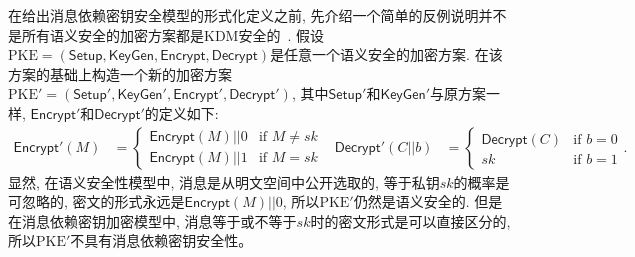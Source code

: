 在给出消息依赖密钥安全模型的形式化定义之前, 先介绍一个简单的反例说明并不是所有语义安全的加密方案都是KDM安全的~\cite{CGH2012}. 假设$\text{PKE} = (\mathsf{Setup}, \mathsf{KeyGen}, \mathsf{Encrypt}, \mathsf{Decrypt})$是任意一个语义安全的加密方案. 在该方案的基础上构造一个新的加密方案$\text{PKE}' = (\mathsf{Setup}', \mathsf{KeyGen}', \mathsf{Encrypt}', \mathsf{Decrypt}')$, 其中$\mathsf{Setup}'$和$\mathsf{KeyGen}'$与原方案一样, $\mathsf{Encrypt}'$和$\mathsf{Decrypt}'$的定义如下:
\begin{align*}
\mathsf{Encrypt}'(M)&=\left\{\begin{array}{ll}
\mathsf{Encrypt}(M)||0 & \textrm{if $M\neq sk$}\\
\mathsf{Encrypt}(M)||1 & \textrm{if $M=sk$}
\end{array}\right. &
\mathsf{Decrypt}'(C||b)&=\left\{\begin{array}{ll}
\mathsf{Decrypt}(C) & \textrm{if $b=0$}\\
sk & \textrm{if $b=1$}
\end{array}\right..
\end{align*}
显然, 在语义安全性模型中, 消息是从明文空间中公开选取的, 等于私钥$sk$的概率是可忽略的, 密文的形式永远是$\mathsf{Encrypt}(M)||0$, 所以$\text{PKE}'$仍然是语义安全的. 但是在消息依赖密钥加密模型中, 消息等于或不等于$sk$时的密文形式是可以直接区分的, 所以$\text{PKE}'$不具有消息依赖密钥安全性。

